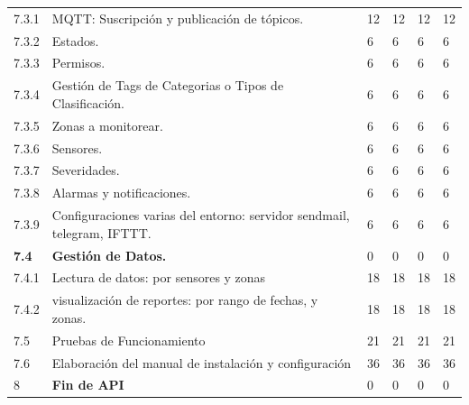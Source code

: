 \documentclass[11pt]{charter}
\begin{document}
\begin{tabularx}{\linewidth}{@{}|p{2cm}|p{11cm}|p{2.5cm}|p{2.5cm}|p{2.5cm}|p{2.5cm}|@{}}
7.3.1          & MQTT: Suscripción y publicación   de tópicos.                                                 & 12   & 12   & 12   & 12   \\
7.3.2          & Estados.                                                                                      & 6    & 6    & 6    & 6    \\
7.3.3          & Permisos.                                                                                     & 6    & 6    & 6    & 6    \\
7.3.4          & Gestión de Tags de Categorias o   Tipos de Clasificación.                                     & 6    & 6    & 6    & 6    \\
7.3.5          & Zonas a monitorear.                                                                           & 6    & 6    & 6    & 6    \\
7.3.6          & Sensores.                                                                                     & 6    & 6    & 6    & 6    \\
7.3.7          & Severidades.                                                                                  & 6    & 6    & 6    & 6    \\
7.3.8          & Alarmas y notificaciones.                                                                     & 6    & 6    & 6    & 6    \\
7.3.9          & Configuraciones varias del   entorno: servidor sendmail, telegram, IFTTT.                     & 6    & 6    & 6    & 6    \\
\textbf{7.4}   & \textbf{Gestión de Datos.}                                                                    & 0    & 0    & 0    & 0    \\
7.4.1          & Lectura de datos: por sensores y   zonas                                                      & 18   & 18   & 18   & 18   \\
7.4.2          & visualización de reportes: por   rango de fechas,  y zonas.                                   & 18   & 18   & 18   & 18   \\
7.5            & Pruebas de Funcionamiento                                                                     & 21   & 21   & 21   & 21   \\
7.6            & Elaboración del manual de   instalación y configuración                                       & 36   & 36   & 36   & 36   \\
8              & \textbf{Fin de API}                                                                           & 0    & 0    & 0    & 0    \\

\end{tabularx}
\end{document}
